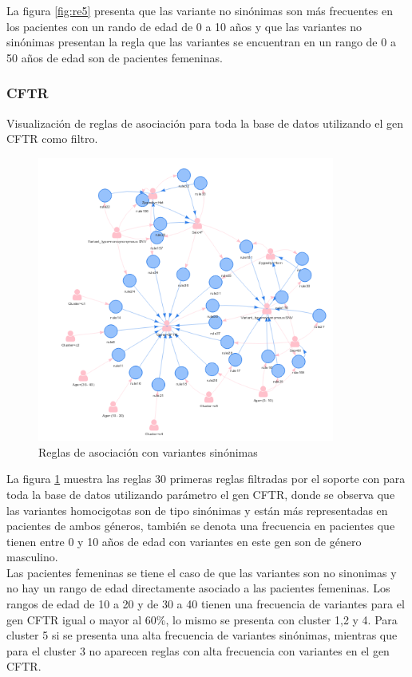 La figura \ref{fig:re5} presenta que las variante no sinónimas son más frecuentes en los pacientes con un rando de edad de 0 a 10 años y que las variantes no sinónimas presentan la regla que las variantes se encuentran en un rango de 0 a 50 años de edad son de pacientes femeninas. 


\subsubsection*{CFTR}

Visualización de reglas de asociación para toda la base de datos utilizando el gen CFTR como filtro. 

\begin{figure}[H]
	\centering
	\includegraphics[width=0.87\textwidth]{Kap4/CFTR1}
	\caption{Reglas de asociación con variantes sinónimas} \label{fig:r6}
\end{figure}

La figura \ref{fig:r6} muestra las reglas 30 primeras reglas filtradas por el soporte con para toda la base de datos utilizando parámetro el gen CFTR, donde se observa que las variantes homocigotas son de tipo sinónimas y están más representadas en pacientes de ambos géneros, también se denota una frecuencia en pacientes que tienen entre 0 y 10 años de edad con variantes en este gen son de género masculino. \\

Las pacientes femeninas se tiene el caso de que las variantes son no sinonimas y no hay un  rango de edad directamente asociado a las pacientes femeninas. Los rangos de edad de 10 a 20 y de 30 a 40 tienen una frecuencia de variantes para el gen CFTR igual o mayor al 60\%, lo mismo se presenta con cluster 1,2 y 4. Para cluster 5 si se presenta una alta frecuencia de variantes sinónimas, mientras que para el cluster 3 no aparecen reglas con alta frecuencia con variantes en el gen CFTR. 


